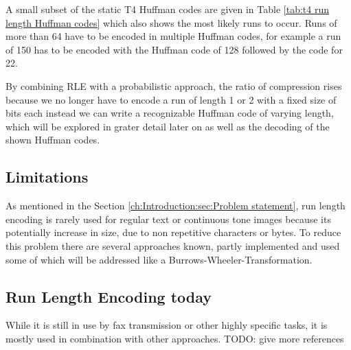 \par{
A small subset of the static T4 Huffman codes are given in Table \ref{tab:t4 run length Huffman
	codes} which also shows the most likely runs to occur. Runs of more than 64 have to be encoded in multiple Huffman codes, for example a run of 150 has to be encoded with the Huffman code of 128 followed by the code for 22.
}
\par{
By combining RLE with a probabilistic approach, the ratio of compression rises because we no longer have to encode a run of length 1 or 2 with a fixed size of bits each instead we can write a recognizable Huffman code of varying length, which will be explored in grater detail later on as well as the decoding of the shown Huffman codes.}

\subsection{Limitations}
\par{
As mentioned in the Section \ref{ch:Introduction:sec:Problem statement}, run length encoding is rarely used for regular text or continuous tone images because its potentially increase in size, due to non repetitive characters or bytes. To reduce this problem there are several approaches known, partly implemented and used some of which will be addressed like a Burrows-Wheeler-Transformation.
}

\subsection{Run Length Encoding today}
\par{
While it is still in use by fax transmission or other highly specific tasks, it is mostly used in combination with other approaches.
TODO: give more references  \cite{rle-dna}
}
